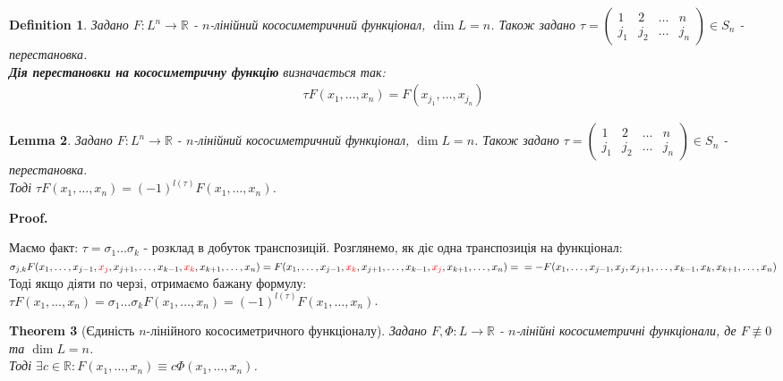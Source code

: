 \documentclass[a4paper, 10pt]{article}
\makeatletter
\def\qed{$\blacksquare$}
\theoremstyle{theoremdd}
\newtheorem{theorem}{Theorem}[subsection]
\theoremstyle{theoremdd}
\newtheorem{definition}[theorem]{Definition}
\theoremstyle{theoremdd}
\theoremstyle{theoremdd}
\theoremstyle{theoremdd}
\theoremstyle{theoremdd}
\theoremstyle{theoremdd}
\newtheorem{lemma}[theorem]{Lemma}
\theoremstyle{theoremdd}
\renewenvironment{proof}[1][Proof.\\]{\par
\pushQED{\hfill \qed}%
\normalfont \topsep6\p@\@plus6\p@\relax
\trivlist
\item\relax
{\bfseries
#1\@addpunct{.}}\hspace\labelsep\ignorespaces
}{%
\popQED\endtrivlist\@endpefalse
}
\makeatother
\begin{document}
	\begin{definition}
	Задано $F: L^n \to \mathbb{R}$ - $n$-лінійний кососиметричний функціонал, $\dim L = n$. Також задано $\tau = \begin{pmatrix} 1 & 2 & \dots & n \\
	j_1 & j_2 & \dots & j_n
\end{pmatrix}	 \in S_n$ - перестановка.\\
\textbf{Дія перестановки на кососиметричну функцію} визначається так:
\begin{align*}
\tau F(x_1,\dots,x_n) = F(x_{j_1},\dots,x_{j_n})
\end{align*}
	\end{definition}
	
	\begin{lemma}
	Задано $F: L^n \to \mathbb{R}$ - $n$-лінійний кососиметричний функціонал, $\dim L = n$. Також задано $\tau = \begin{pmatrix} 1 & 2 & \dots & n \\
	j_1 & j_2 & \dots & j_n
\end{pmatrix}	 \in S_n$ - перестановка.\\
Тоді $\tau F(x_1,\dots, x_n) = (-1)^{l(\tau)}F(x_1,\dots,x_n)$.
	\end{lemma}
	
	\begin{proof}
	Маємо факт: $\tau = \sigma_1 \dots \sigma_k$ - розклад в добуток транспозицій. Розглянемо, як діє одна транспозиція на функціонал:\\
$\sigma_{j,k}F(x_1,\dots,x_{j-1},\textcolor{red}{x_j},x_{j+1},\dots,x_{k-1},\textcolor{red}{x_k},x_{k+1},\dots,x_n) = F(x_1,\dots,x_{j-1},\textcolor{red}{x_k},x_{j+1},\dots,x_{k-1},\textcolor{red}{x_j},x_{k+1},\dots,x_n) = \\ = -F(x_1,\dots,x_{j-1},x_j,x_{j+1},\dots,x_{k-1},x_k,x_{k+1},\dots,x_n)$\\
Тоді якщо діяти по черзі, отримаємо бажану формулу:\\
$\tau F(x_1,\dots,x_n) = \sigma_1 \dots \sigma_k F(x_1,\dots,x_n) = (-1)^{l(\tau)}F(x_1,\dots,x_n)$.
\end{proof}

\begin{theorem}[Єдиність $n$-лінійного кососиметричного функціоналу]
Задано $F,\Phi: L \to \mathbb{R}$ - $n$-лінійні кососиметричні функціонали, де $F \not\equiv 0$ та $\dim L = n$.\\
Тоді $\exists c \in \mathbb{R}: F(x_1,\dots,x_n) \equiv c\Phi(x_1,\dots,x_n)$.
\end{theorem}
\end{document}

